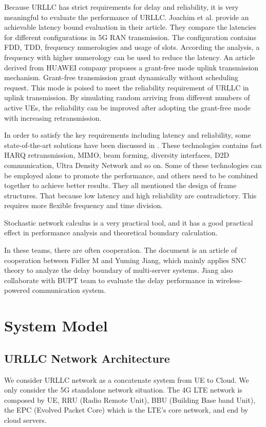 \documentclass[runningheads]{llncs}
\begin{document}
Because URLLC has strict requirements for delay and reliability, it is very meaningful to evaluate the performance of URLLC.
Joachim et al. provide an achievable latency bound evaluation in their article\cite{article_joachim}.
They compare the latencies for different configurations in 5G RAN transmission.
The configuration contains FDD, TDD, frequency numerologies and usage of slots.
According the analysis, a frequency with higher numerology can be used to reduce the latency.
An article derived from HUAWEI company proposes a grant-free mode uplink transmission mechanism\cite{proc_Huawei}.
Grant-free transmission grant dynamically without scheduling request.
This mode is poised to meet the reliability requirement of URLLC in uplink transmission.
By simulating random arriving from different numbers of active UEs, the reliability can be improved after adopting the grant-free mode with increasing retransmission.

In order to satisfy the key requirements including latency and reliability, some state-of-the-art solutions have been discussed in \cite{article_Achieving}\cite{article_Wireless}\cite{article_Introduction}\cite{article_Physical}.
These technologies contains fast HARQ retransmission, MIMO, beam forming, diversity interfaces, D2D communication, Ultra Density Network and so on.
Some of these technologies can be employed alone to promote the performance, and others need to be combined together to achieve better results.
They all mentioned the design of frame structures.
That because low latency and high reliability are contradictory.
This requires more flexible frequency and time division.

Stochastic network calculus is a very practical tool, and it has a good practical effect in performance analysis and theoretical boundary calculation.

In these teams, there are often cooperation. The document \cite{MF_jiang} is an article of cooperation between Fidler M and Yuming Jiang, which mainly applies SNC theory to analyze the delay boundary of multi-server systems. Jiang also collaborate with BUPT team to evaluate the delay performance in wireless-powered communication system\cite{beiyou_1}.

\section{System Model}
\subsection{URLLC Network Architecture}
We consider URLLC network as a concatenate system from UE to Cloud. We only consider the 5G standalone network situation.
The 4G LTE network is composed by UE, RRU (Radio Remote Unit), BBU (Building Base band Unit), the EPC (Evolved Packet Core) which is the LTE's core network, and end by cloud servers.
\end{document}
